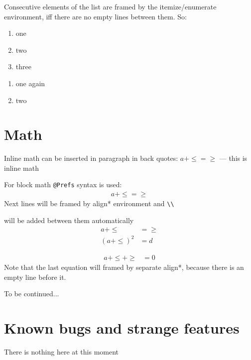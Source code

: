 \documentclass[12pt,a4paper,oneside]{article}
\begin{document}
    Consecutive elements of the list are framed by the itemize/enumerate environment, iff there are
    no empty lines between them. So:
    \begin{enumerate}
      \item one
      \item two
      \item three
    \end{enumerate}

    \begin{enumerate}
      \item one again
      \item two
    \end{enumerate}

  \section{Math}
    Inline math can be inserted in paragraph in back quotes: $a + \leq = \geq$ --- this is inline
    math

    For block math \texttt{@Prefs} syntax is used:
    \begin{align*}
      a + \leq = \geq
    \end{align*}
    Next lines will be framed by align* environment and \verb.\\.

    will be added between them automatically
    \begin{align*}
      a + \leq &= \geq\\
      (a + \leq)^2 &= d
    \end{align*}

    \begin{align*}
      a + \leq + \geq &= 0
    \end{align*}
    Note that the last equation will framed by separate align*, because there is an empty line
    before it.

  To be continued...
  \section{Known bugs and strange features}
    There is nothing here at this moment
\end{document}
